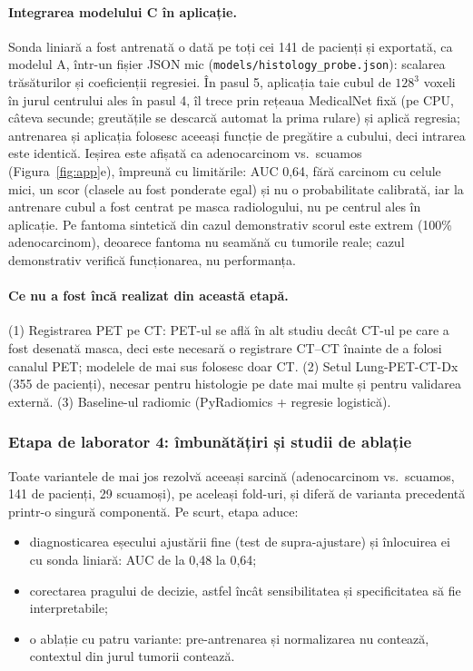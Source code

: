 \documentclass[11pt, a4paper]{article}
\begin{document}
\paragraph{Integrarea modelului C în aplicație.} Sonda liniară a fost antrenată o dată pe toți cei 141 de pacienți și exportată, ca modelul A, într-un fișier JSON mic (\texttt{models/\allowbreak histology\_probe.json}): scalarea trăsăturilor și coeficienții regresiei. În pasul 5, aplicația taie cubul de $128^3$ voxeli în jurul centrului ales în pasul 4, îl trece prin rețeaua MedicalNet fixă (pe CPU, câteva secunde; greutățile se descarcă automat la prima rulare) și aplică regresia; antrenarea și aplicația folosesc aceeași funcție de pregătire a cubului, deci intrarea este identică. Ieșirea este afișată ca adenocarcinom vs.\ scuamos (Figura~\ref{fig:app}e), împreună cu limitările: AUC 0,64, fără carcinom cu celule mici, un scor (clasele au fost ponderate egal) și nu o probabilitate calibrată, iar la antrenare cubul a fost centrat pe masca radiologului, nu pe centrul ales în aplicație. Pe fantoma sintetică din cazul demonstrativ scorul este extrem (100\% adenocarcinom), deoarece fantoma nu seamănă cu tumorile reale; cazul demonstrativ verifică funcționarea, nu performanța.

\paragraph{Ce nu a fost încă realizat din această etapă.} (1) Registrarea PET pe CT: PET-ul se află în alt studiu decât CT-ul pe care a fost desenată masca, deci este necesară o registrare CT--CT înainte de a folosi canalul PET; modelele de mai sus folosesc doar CT. (2) Setul Lung-PET-CT-Dx (355 de pacienți), necesar pentru histologie pe date mai multe și pentru validarea externă. (3) Baseline-ul radiomic (PyRadiomics + regresie logistică).

\subsubsection{Etapa de laborator 4: îmbunătățiri și studii de ablație}

Toate variantele de mai jos rezolvă aceeași sarcină (adenocarcinom vs.\ scuamos, 141 de pacienți, 29 scuamoși), pe aceleași fold-uri, și diferă de varianta precedentă printr-o singură componentă. Pe scurt, etapa aduce:
\begin{itemize}
    \item diagnosticarea eșecului ajustării fine (test de supra-ajustare) și înlocuirea ei cu sonda liniară: AUC de la 0,48 la 0,64;
    \item corectarea pragului de decizie, astfel încât sensibilitatea și specificitatea să fie interpretabile;
    \item o ablație cu patru variante: pre-antrenarea și normalizarea nu contează, contextul din jurul tumorii contează.
\end{itemize}
\end{document}
